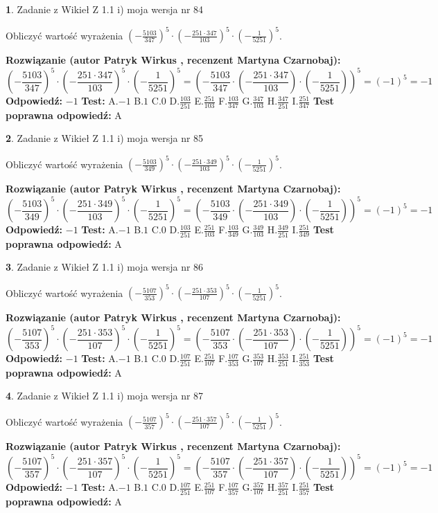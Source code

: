 \documentclass[12pt, a4paper]{article}
\theoremstyle{definition} %
\newtheorem{zad}{}
\newcommand{\zadStart}[1]{\begin{zad}#1\newline}
\newcommand{\zadStop}{\end{zad}}
\newcommand{\rozwStart}[2]{\noindent \textbf{Rozwiązanie (autor #1 , recenzent #2): }\newline}
\newcommand{\rozwStop}{\newline}
\newcommand{\odpStart}{\noindent \textbf{Odpowiedź:}\newline}
\newcommand{\odpStop}{\newline}
\newcommand{\testStart}{\noindent \textbf{Test:}\newline}
\newcommand{\testStop}{\newline}
\newcommand{\kluczStart}{\noindent \textbf{Test poprawna odpowiedź:}\newline}
\newcommand{\kluczStop}{\newline}
\begin{document}
\zadStart{Zadanie z Wikieł Z 1.1 i) moja wersja nr 84}

Obliczyć wartość wyrażenia $(-\frac{5103}{347})^{5} \cdot (-\frac{251 \cdot 347}{103})^{5} \cdot (-\frac{1}{5251})^{5}$.
\zadStop
\rozwStart{Patryk Wirkus}{Martyna Czarnobaj}
$$(-\frac{5103}{347})^{5} \cdot (-\frac{251 \cdot 347}{103})^{5} \cdot (-\frac{1}{5251})^{5} = (-\frac{5103}{347} \cdot (-\frac{251 \cdot 347}{103}) \cdot (-\frac{1}{5251}))^{5} = (-1)^{5} = -1$$
\rozwStop
\odpStart
$-1$
\odpStop
\testStart
A.$-1$ B.$1$ C.$0$ D.$\frac{103}{251}$ E.$\frac{251}{103}$
F.$\frac{103}{347}$ G.$\frac{347}{103}$
H.$\frac{347}{251}$
I.$\frac{251}{347}$
\testStop
\kluczStart
A
\kluczStop



\zadStart{Zadanie z Wikieł Z 1.1 i) moja wersja nr 85}

Obliczyć wartość wyrażenia $(-\frac{5103}{349})^{5} \cdot (-\frac{251 \cdot 349}{103})^{5} \cdot (-\frac{1}{5251})^{5}$.
\zadStop
\rozwStart{Patryk Wirkus}{Martyna Czarnobaj}
$$(-\frac{5103}{349})^{5} \cdot (-\frac{251 \cdot 349}{103})^{5} \cdot (-\frac{1}{5251})^{5} = (-\frac{5103}{349} \cdot (-\frac{251 \cdot 349}{103}) \cdot (-\frac{1}{5251}))^{5} = (-1)^{5} = -1$$
\rozwStop
\odpStart
$-1$
\odpStop
\testStart
A.$-1$ B.$1$ C.$0$ D.$\frac{103}{251}$ E.$\frac{251}{103}$
F.$\frac{103}{349}$ G.$\frac{349}{103}$
H.$\frac{349}{251}$
I.$\frac{251}{349}$
\testStop
\kluczStart
A
\kluczStop



\zadStart{Zadanie z Wikieł Z 1.1 i) moja wersja nr 86}

Obliczyć wartość wyrażenia $(-\frac{5107}{353})^{5} \cdot (-\frac{251 \cdot 353}{107})^{5} \cdot (-\frac{1}{5251})^{5}$.
\zadStop
\rozwStart{Patryk Wirkus}{Martyna Czarnobaj}
$$(-\frac{5107}{353})^{5} \cdot (-\frac{251 \cdot 353}{107})^{5} \cdot (-\frac{1}{5251})^{5} = (-\frac{5107}{353} \cdot (-\frac{251 \cdot 353}{107}) \cdot (-\frac{1}{5251}))^{5} = (-1)^{5} = -1$$
\rozwStop
\odpStart
$-1$
\odpStop
\testStart
A.$-1$ B.$1$ C.$0$ D.$\frac{107}{251}$ E.$\frac{251}{107}$
F.$\frac{107}{353}$ G.$\frac{353}{107}$
H.$\frac{353}{251}$
I.$\frac{251}{353}$
\testStop
\kluczStart
A
\kluczStop



\zadStart{Zadanie z Wikieł Z 1.1 i) moja wersja nr 87}

Obliczyć wartość wyrażenia $(-\frac{5107}{357})^{5} \cdot (-\frac{251 \cdot 357}{107})^{5} \cdot (-\frac{1}{5251})^{5}$.
\zadStop
\rozwStart{Patryk Wirkus}{Martyna Czarnobaj}
$$(-\frac{5107}{357})^{5} \cdot (-\frac{251 \cdot 357}{107})^{5} \cdot (-\frac{1}{5251})^{5} = (-\frac{5107}{357} \cdot (-\frac{251 \cdot 357}{107}) \cdot (-\frac{1}{5251}))^{5} = (-1)^{5} = -1$$
\rozwStop
\odpStart
$-1$
\odpStop
\testStart
A.$-1$ B.$1$ C.$0$ D.$\frac{107}{251}$ E.$\frac{251}{107}$
F.$\frac{107}{357}$ G.$\frac{357}{107}$
H.$\frac{357}{251}$
I.$\frac{251}{357}$
\testStop
\kluczStart
A
\kluczStop
\end{document}

